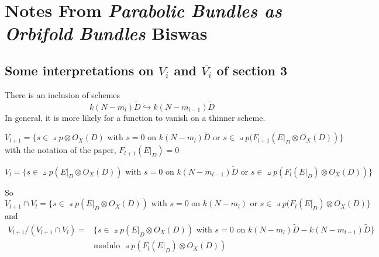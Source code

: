 \documentclass{article}
\begin{document}
\section{Notes From \emph{Parabolic Bundles as Orbifold Bundles} Biswas}
\subsection{Some interpretations on $V_i$ and $\bar{V_i}$ of section 3}
\newcommand{\with}{\text{ with }}
\newcommand{\on}{\text{ on }}
\renewcommand{\or}{\text{ or }}
There is an inclusion of schemes
\[
    k(N - m_l)\tilde{D} \hookrightarrow k(N - m_{l-1})\tilde{D}
\]
In general, it is more likely for a function to vanish on a thinner scheme. 


\[
    V_{l+1} = \{ s \in \pullback{p}\otimes O_X(D) \with
        s = 0 \on k(N - m_l)\tilde{D}
        \or s \in \pullback{p}(F_{l+1}(E|_D\otimes O_X(D))\}
\]
with the notation of the paper, $F_{l+1}(E|_D) = 0$

\[
    V_l = \{ s \in \pullback{p}(E|_D\otimes O_X(D)) \with
        s = 0 \on k(N - m_{l-1})\tilde{D} 
        \or s \in \pullback{p}(F_l(E|_D)\otimes O_X(D))\}
\]

So
\[
    V_{l+1}\cap V_l = \{ s \in \pullback{p}(E|_D\otimes O_X(D)) \with
        s = 0 \on k(N - m_l) 
        \or s \in \pullback{p}(F_l(E|_D)\otimes O_X(D)\}
\]
and
\begin{align}
    V_{l+1}/(V_{l+1}\cap V_l) = &
        \{ s \in \pullback{p}(E|_D\otimes O_X(D)) \with
         s = 0 \on k(N - m_l)\tilde{D} -  k(N - m_{l-1})\tilde{D}\} \\
    &\text{modulo } \pullback{p}(F_l(E|_D)\otimes O_X(D))
\end{align}
\end{document}
